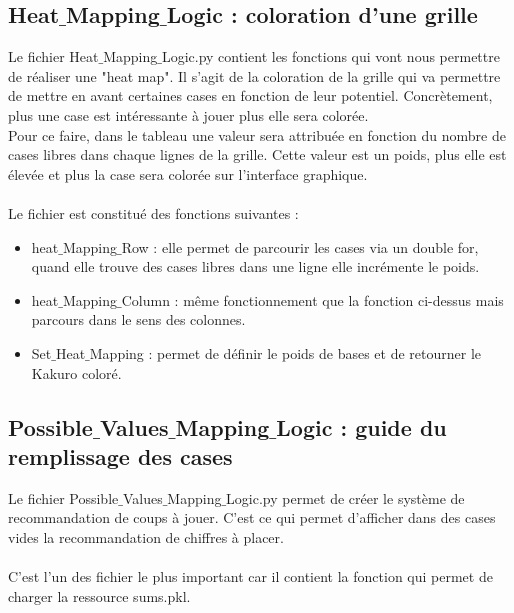 \documentclass[12pt]{article}
\begin{document}
\subsection{Heat$\_$Mapping$\_$Logic : coloration d'une grille}

Le fichier Heat$\_$Mapping$\_$Logic.py contient les fonctions qui vont nous permettre de réaliser une "heat map". Il s'agit de la coloration de la grille qui va permettre de mettre en avant certaines cases en fonction de leur potentiel. Concrètement, plus une case est intéressante à jouer plus elle sera colorée. \\
Pour ce faire, dans le tableau une valeur sera attribuée en fonction du nombre de cases libres dans chaque lignes de la grille. Cette valeur est un poids, plus elle est élevée et plus la case sera colorée sur l'interface graphique.  \\ \\

Le fichier est constitué des fonctions suivantes : \\
\begin{itemize}

\item[]heat$\_$Mapping$\_$Row : elle permet de parcourir les cases via un double for, quand elle trouve des cases libres dans  une ligne elle incrémente le poids. \\

\item[]heat$\_$Mapping$\_$Column : même fonctionnement que la fonction ci-dessus mais parcours dans le sens des colonnes. \\

\item[]Set$\_$Heat$\_$Mapping : permet de définir le poids de bases et de retourner le Kakuro coloré.\\
\end{itemize}

\subsection{Possible$\_$Values$\_$Mapping$\_$Logic : guide du remplissage des cases}
Le fichier Possible$\_$Values$\_$Mapping$\_$Logic.py permet de créer le système de recommandation de coups à jouer. C'est ce qui permet d'afficher dans des cases vides la recommandation de chiffres à placer. \\ \\
C'est l'un des fichier le plus important car il contient la fonction qui permet de charger la ressource sums.pkl. \\ \\
\end{document}
